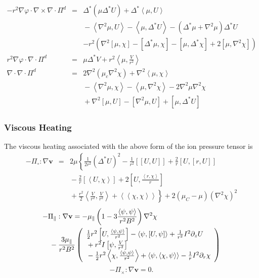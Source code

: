\documentclass[letterpaper]{book}
\renewcommand{\vec}[1]{\ensuremath{\mathbf{#1}}}
\newcommand{\tensor}[1]{\mathsf{#1}}
\newcommand{\tor}{\varphi}              %
\renewcommand{\v}{\vec{v}}
\renewcommand{\P}{\tensor{\Pi}}
\newcommand{\grad}[1]{\nabla #1}
\renewcommand{\div}[1]{\nabla \cdot #1}
\newcommand{\curl}[1]{\nabla \times #1}
\newcommand{\dotdot}{:}
\newcommand{\gs}[1]{\Delta^* #1}
\newcommand{\lp}[1]{\nabla^2 #1}
\newcommand{\pb}[2]{\left[#1,#2\right]}
\newcommand{\ip}[2]{\left\langle  #1,#2\right\rangle}
\newcommand{\funcss}[2]{
  \left\langle\left\langle #1,#2 \right\rangle\right\rangle}
\newcommand{\funcsa}[2]{\left[\left\langle #1,#2 \right\rangle\right]}
\newcommand{\funcaa}[2]{\left[\left[ #1,#2 \right]\right]}
\begin{document}
\begin{eqnarray}
  -r^2 \grad{\tor} \cdot \curl{\div \P^d} & = & 
   \gs{(\mu \gs{U})} + \gs{\ip{\mu}{U}} \\ 
   && \mbox{} - \ip{\lp{\mu}}{U} -
   \ip{\mu}{\gs{U}} - (\gs{\mu} + \lp{\mu})\gs{U} \nonumber \\
   && - \mbox{} r^2 \left(\lp{\pb{\mu}{\chi}} - \pb{\gs{\mu}}{\chi}
   - \pb{\mu}{\gs{\chi}} + 2 \pb{\mu}{\lp{\chi}} \right) \nonumber
   \\
   r^2 \grad \tor \cdot \div \P^d & = & \mu \gs{V} + r^2
   \ip{\mu}{\frac{V}{r^2}}
   \\
   \div \div \Pi^d & = & 2 \lp{(\mu_c \lp{\chi})} + \lp\ip{\mu}{\chi}
   \\  && \mbox{} - \ip{\lp\mu}{\chi} - \ip{\mu}{\lp\chi}
   - 2 \lp\mu\lp\chi \nonumber
   \\ && \mbox{}  + \lp\pb{\mu}{U} - \pb{\lp\mu}{U} + \pb{\mu}{\gs{U}}
   \nonumber
\end{eqnarray}

\subsubsection{Viscous Heating}

The viscous heating associated with the above form of the ion pressure
tensor is
\begin{eqnarray}
  - \Pi_\circ \dotdot \grad{\v} & = & 2 \mu \left\{
    \frac{1}{2 r^2} (\gs{U})^2 
    - \frac{1}{r^2} \funcaa{U}{U} + \frac{2}{r} \pb{U}{\pb{r}{U}}
    \right. \\ \nonumber & & \left. \mbox{} 
    - \frac{2}{r} \funcsa{U}{\chi} + 2 \pb{U}{\frac{\ip{r}{\chi}}{r}}
    \right. \\ \nonumber & & \left. \mbox{}
    + \frac{r^2}{2} \ip{\frac{V}{r^2}}{\frac{V}{r^2}}
    + \funcss{\chi}{\chi} \right\}
  + 2 (\mu_C - \mu) (\lp{\chi})^2
\end{eqnarray}
\begin{eqnarray}
  \lefteqn{-\Pi_\parallel \dotdot \grad{\v} = - \mu_\parallel
    \left( 1-3 \frac{\ip{\psi}{\psi}}{r^2 B^2} \right) \lp{\chi}}
  \\ && \mbox{}
    - \frac{3 \mu_\parallel}{r^2 B^2} \left( \begin{array}{l}
      \frac{1}{2} r^2 \pb{U}{\frac{\ip{\psi}{\psi}}{r^2}}
      -\ip{\psi}{\pb{U}{\psi}} + \frac{1}{r^2} I^2 \partial_z U
       \\ \mbox{}
    + r^2 I \pb{\psi}{\frac{V}{r^2}}
       \\ \mbox{}
    - \frac{1}{2}r^2 \ip{\chi}{\frac{\ip{\psi}{\psi}}{r^2}}
    + \ip{\psi}{\ip{\chi}{\psi}} - \frac{1}{r}I^2 \partial_r \chi
    \end{array}    \right)\nonumber
\end{eqnarray}
\begin{equation}
  - \Pi_\times \dotdot \grad{\v} = 0.
\end{equation}
\end{document}
